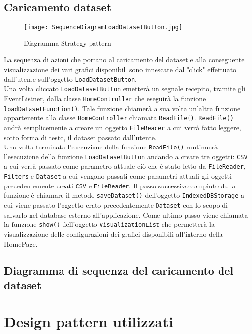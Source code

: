 \subsection{Caricamento dataset}
\begin{figure}[H]
	\centering
	\texttt{[image: SequenceDiagramLoadDatasetButton.jpg]}
	\caption{Diagramma Strategy pattern}
  \end{figure}
  La sequenza di azioni che portano al caricamento del dataset e alla conseguente visualizzazione dei vari grafici disponibili sono innescate dal "click" effettuato dall'utente sull'oggetto \texttt{LoadDatasetButton}.\\
Una volta cliccato \texttt{LoadDatasetButton} emetterà un segnale recepito, tramite gli EventListner, dalla classe \texttt{HomeController} che eseguirà la funzione \texttt{loadDatasetFunction()}. Tale funzione chiamerà a sua volta un'altra funzione appartenente alla classe \texttt{HomeController} chiamata \texttt{ReadFile()}.
\texttt{ReadFile()} andrà semplicemente a creare un oggetto \texttt{FileReader} a cui verrà fatto leggere, sotto forma di testo, il dataset passato dall'utente. \\
Una volta terminata l'esecuzione della funzione \texttt{ReadFile()} continuerà l'esecuzione della funzione \texttt{LoadDatasetButton} andando a creare tre oggetti: 
\texttt{CSV} a cui verrà passato come parametro attuale ciò che è stato letto da \texttt{FileReader}, \texttt{Filters} e \texttt{Dataset} a cui vengono passati come parametri attuali gli oggetti precedentemente creati \texttt{CSV} e \texttt{FileReader}.
Il passo successivo compiuto dalla funzione è chiamare il metodo \texttt{saveDataset()} dell'oggetto \texttt{IndexedDBStorage} a cui viene passato l'oggetto crato precedentemente \texttt{Dataset} con lo scopo di salvarlo nel database esterno all'applicazione.
Come ultimo passo viene chiamata la funzione \texttt{show()} dell'oggetto \texttt{VisualizationList} che permetterà la visualizzazione delle configurazioni dei grafici disponibili all'interno della HomePage.

\subsection{Diagramma di sequenza del caricamento del dataset}

\section{Design pattern utilizzati}

